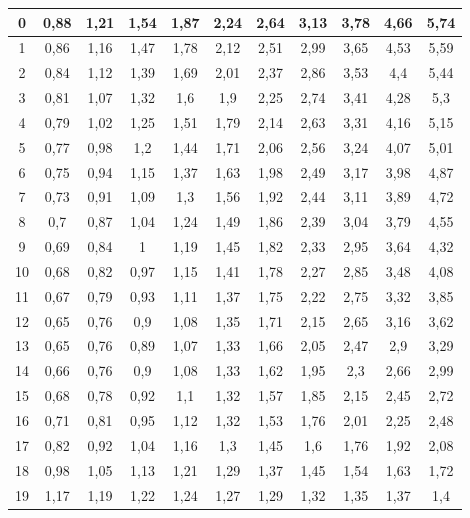 \begin{longtable}[H]{|c|c|c|c|c|c|c|c|c|c|c|}
    0 & 0,88 & 1,21 & 1,54 & 1,87 & 2,24 & 2,64 & 3,13 & 3,78 & 4,66 & 5,74  \\ \hline
    1 & 0,86 & 1,16 & 1,47 & 1,78 & 2,12 & 2,51 & 2,99 & 3,65 & 4,53 & 5,59  \\ \hline
    2 & 0,84 & 1,12 & 1,39 & 1,69 & 2,01 & 2,37 & 2,86 & 3,53 & 4,4 & 5,44  \\ \hline
    3 & 0,81 & 1,07 & 1,32 & 1,6 & 1,9 & 2,25 & 2,74 & 3,41 & 4,28 & 5,3  \\ \hline
    4 & 0,79 & 1,02 & 1,25 & 1,51 & 1,79 & 2,14 & 2,63 & 3,31 & 4,16 & 5,15  \\ \hline
    5 & 0,77 & 0,98 & 1,2 & 1,44 & 1,71 & 2,06 & 2,56 & 3,24 & 4,07 & 5,01  \\ \hline
    6 & 0,75 & 0,94 & 1,15 & 1,37 & 1,63 & 1,98 & 2,49 & 3,17 & 3,98 & 4,87  \\ \hline
    7 & 0,73 & 0,91 & 1,09 & 1,3 & 1,56 & 1,92 & 2,44 & 3,11 & 3,89 & 4,72  \\ \hline
    8 & 0,7 & 0,87 & 1,04 & 1,24 & 1,49 & 1,86 & 2,39 & 3,04 & 3,79 & 4,55  \\ \hline
    9 & 0,69 & 0,84 & 1 & 1,19 & 1,45 & 1,82 & 2,33 & 2,95 & 3,64 & 4,32  \\ \hline
    10 & 0,68 & 0,82 & 0,97 & 1,15 & 1,41 & 1,78 & 2,27 & 2,85 & 3,48 & 4,08  \\ \hline
    11 & 0,67 & 0,79 & 0,93 & 1,11 & 1,37 & 1,75 & 2,22 & 2,75 & 3,32 & 3,85  \\ \hline
    12 & 0,65 & 0,76 & 0,9 & 1,08 & 1,35 & 1,71 & 2,15 & 2,65 & 3,16 & 3,62  \\ \hline
    13 & 0,65 & 0,76 & 0,89 & 1,07 & 1,33 & 1,66 & 2,05 & 2,47 & 2,9 & 3,29  \\ \hline
    14 & 0,66 & 0,76 & 0,9 & 1,08 & 1,33 & 1,62 & 1,95 & 2,3 & 2,66 & 2,99  \\ \hline
    15 & 0,68 & 0,78 & 0,92 & 1,1 & 1,32 & 1,57 & 1,85 & 2,15 & 2,45 & 2,72  \\ \hline
    16 & 0,71 & 0,81 & 0,95 & 1,12 & 1,32 & 1,53 & 1,76 & 2,01 & 2,25 & 2,48  \\ \hline
    17 & 0,82 & 0,92 & 1,04 & 1,16 & 1,3 & 1,45 & 1,6 & 1,76 & 1,92 & 2,08  \\ \hline
    18 & 0,98 & 1,05 & 1,13 & 1,21 & 1,29 & 1,37 & 1,45 & 1,54 & 1,63 & 1,72  \\ \hline
    19  & 1,17 & 1,19 & 1,22 & 1,24 & 1,27 & 1,29 & 1,32 & 1,35 & 1,37 & 1,4 \\ \hline
    \end{longtable}


